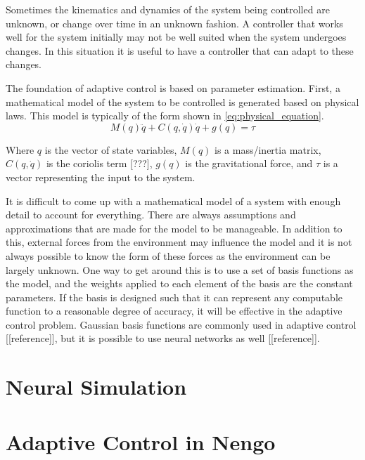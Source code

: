 \documentclass[letterpaper,12pt,titlepage,oneside,final]{book}
\begin{document}
Sometimes the kinematics and dynamics of the system being controlled are unknown, or change over time in an unknown fashion. 
A controller that works well for the system initially may not be well suited when the system undergoes changes. 
In this situation it is useful to have a controller that can adapt to these changes.

The foundation of adaptive control is based on parameter estimation. 
First, a mathematical model of the system to be controlled is generated based on physical laws. 
This model is typically of the form shown in \eqref{eq:physical_equation}.
\begin{equation} \label{eq:physical_equation}
M(q)\ddot{q} + C(q,\dot{q})\dot{q} + g(q) = \tau
\end{equation}

Where $q$ is the vector of state variables, $M(q)$ is a mass/inertia matrix, $C(q,\dot{q})$ is the coriolis term [???], $g(q)$ is the gravitational force, and $\tau$ is a vector representing the input to the system.


It is difficult to come up with a mathematical model of a system with enough detail to account for everything. 
There are always assumptions and approximations that are made for the model to be manageable. In addition to this, external forces from the environment may influence the model and it is not always possible to know the form of these forces as the environment can be largely unknown. 
One way to get around this is to use a set of basis functions as the model, and the weights applied to each element of the basis are the constant parameters. 
If the basis is designed such that it can represent any computable function to a reasonable degree of accuracy, it will be effective in the adaptive control problem. 
Gaussian basis functions are commonly used in adaptive control [[reference]], but it is possible to use neural networks as well [[reference]].

\section{Neural Simulation}


\section{Adaptive Control in Nengo}
\end{document}
